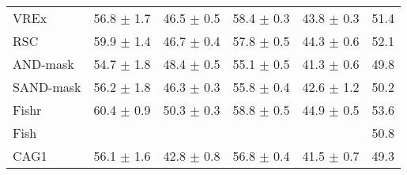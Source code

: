 \documentclass{article}
\begin{document}
\begin{center}
{\begin{tabular}{lccccc}
VREx                 & 56.8 $\pm$ 1.7       & 46.5 $\pm$ 0.5       & 58.4 $\pm$ 0.3       & 43.8 $\pm$ 0.3       & 51.4                 \\
RSC                  & 59.9 $\pm$ 1.4       & 46.7 $\pm$ 0.4       & 57.8 $\pm$ 0.5       & 44.3 $\pm$ 0.6       & 52.1                 \\
AND-mask             & 54.7 $\pm$ 1.8       & 48.4 $\pm$ 0.5       & 55.1 $\pm$ 0.5       & 41.3 $\pm$ 0.6       & 49.8                 \\
SAND-mask            & 56.2 $\pm$ 1.8       & 46.3 $\pm$ 0.3       & 55.8 $\pm$ 0.4       & 42.6 $\pm$ 1.2       & 50.2                 \\
Fishr                & 60.4 $\pm$ 0.9       & 50.3 $\pm$ 0.3       & 58.8 $\pm$ 0.5       & 44.9 $\pm$ 0.5       & 53.6                 \\
Fish                 &                      &                      &                      &                      & 50.8                 \\
\midrule
CAG1                 & 56.1 $\pm$ 1.6       & 42.8 $\pm$ 0.8       & 56.8 $\pm$ 0.4       & 41.5 $\pm$ 0.7       & 49.3                 \\

\bottomrule
\end{tabular}}
\end{center}
\end{document}
